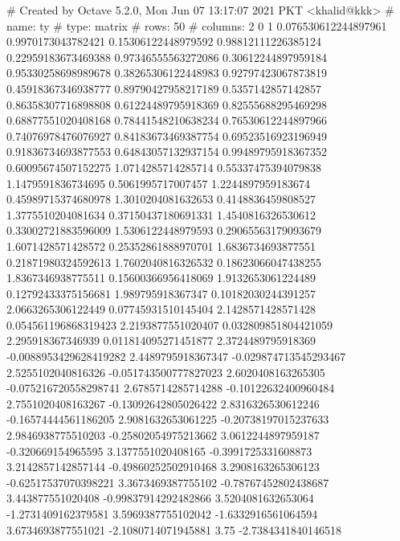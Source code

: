 # Created by Octave 5.2.0, Mon Jun 07 13:17:07 2021 PKT <khalid@kkk>
# name: ty
# type: matrix
# rows: 50
# columns: 2
 0 1
 0.076530612244897961 0.9970173043782421
 0.15306122448979592 0.98812111226385124
 0.22959183673469388 0.97346555563272086
 0.30612244897959184 0.95330258698989678
 0.38265306122448983 0.92797423067873819
 0.45918367346938777 0.89790427958217189
 0.5357142857142857 0.86358307716898808
 0.61224489795918369 0.82555688295469298
 0.68877551020408168 0.78441548210638234
 0.76530612244897966 0.74076978476076927
 0.84183673469387754 0.69523516923196949
 0.91836734693877553 0.64843057132937154
 0.99489795918367352 0.60095674507152275
 1.0714285714285714 0.55337475394079838
 1.1479591836734695 0.5061995717007457
 1.2244897959183674 0.45989715374680978
 1.3010204081632653 0.4148836459808527
 1.3775510204081634 0.37150437180691331
 1.4540816326530612 0.33002721883596009
 1.5306122448979593 0.29065563179093679
 1.6071428571428572 0.25352861888970701
 1.6836734693877551 0.21871980324592613
 1.7602040816326532 0.18623066047438255
 1.8367346938775511 0.15600366956418069
 1.9132653061224489 0.12792433375156681
 1.989795918367347 0.10182030244391257
 2.0663265306122449 0.07745931510145404
 2.1428571428571428 0.054561196868319423
 2.2193877551020407 0.032809851804421059
 2.295918367346939 0.011814095271451877
 2.3724489795918369 -0.0088953429628419282
 2.4489795918367347 -0.029874713545293467
 2.5255102040816326 -0.051743500777827023
 2.6020408163265305 -0.075216720558298741
 2.6785714285714288 -0.10122632400960484
 2.7551020408163267 -0.13092642805026422
 2.8316326530612246 -0.16574444561186205
 2.9081632653061225 -0.20738197015237633
 2.9846938775510203 -0.25802054975213662
 3.0612244897959187 -0.320669154965595
 3.1377551020408165 -0.3991725331608873
 3.2142857142857144 -0.49860252502910468
 3.2908163265306123 -0.62517537070398221
 3.3673469387755102 -0.78767452802438687
 3.443877551020408 -0.99837914292482866
 3.5204081632653064 -1.2731409162379581
 3.5969387755102042 -1.6332916561064594
 3.6734693877551021 -2.1080714071945881
 3.75 -2.7384341840146518


